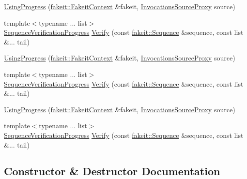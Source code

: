 \begin{DoxyCompactItemize}
\item 
\mbox{\hyperlink{classfakeit_1_1UsingProgress_ac87db7ffa3ed53507cb2c98c2c0b4ee7}{Using\+Progress}} (\mbox{\hyperlink{structfakeit_1_1FakeitContext}{fakeit\+::\+Fakeit\+Context}} \&fakeit, \mbox{\hyperlink{structfakeit_1_1InvocationsSourceProxy}{Invocations\+Source\+Proxy}} source)
\item 
{\footnotesize template$<$typename ... list$>$ }\\\mbox{\hyperlink{classfakeit_1_1SequenceVerificationProgress}{Sequence\+Verification\+Progress}} \mbox{\hyperlink{classfakeit_1_1UsingProgress_a56c5d1ecdf4f405a4a85b348e1fad0f1}{Verify}} (const \mbox{\hyperlink{classfakeit_1_1Sequence}{fakeit\+::\+Sequence}} \&sequence, const list \&... tail)
\item 
\mbox{\hyperlink{classfakeit_1_1UsingProgress_ac87db7ffa3ed53507cb2c98c2c0b4ee7}{Using\+Progress}} (\mbox{\hyperlink{structfakeit_1_1FakeitContext}{fakeit\+::\+Fakeit\+Context}} \&fakeit, \mbox{\hyperlink{structfakeit_1_1InvocationsSourceProxy}{Invocations\+Source\+Proxy}} source)
\item 
{\footnotesize template$<$typename ... list$>$ }\\\mbox{\hyperlink{classfakeit_1_1SequenceVerificationProgress}{Sequence\+Verification\+Progress}} \mbox{\hyperlink{classfakeit_1_1UsingProgress_a56c5d1ecdf4f405a4a85b348e1fad0f1}{Verify}} (const \mbox{\hyperlink{classfakeit_1_1Sequence}{fakeit\+::\+Sequence}} \&sequence, const list \&... tail)
\item 
\mbox{\hyperlink{classfakeit_1_1UsingProgress_ac87db7ffa3ed53507cb2c98c2c0b4ee7}{Using\+Progress}} (\mbox{\hyperlink{structfakeit_1_1FakeitContext}{fakeit\+::\+Fakeit\+Context}} \&fakeit, \mbox{\hyperlink{structfakeit_1_1InvocationsSourceProxy}{Invocations\+Source\+Proxy}} source)
\item 
{\footnotesize template$<$typename ... list$>$ }\\\mbox{\hyperlink{classfakeit_1_1SequenceVerificationProgress}{Sequence\+Verification\+Progress}} \mbox{\hyperlink{classfakeit_1_1UsingProgress_a56c5d1ecdf4f405a4a85b348e1fad0f1}{Verify}} (const \mbox{\hyperlink{classfakeit_1_1Sequence}{fakeit\+::\+Sequence}} \&sequence, const list \&... tail)
\end{DoxyCompactItemize}


\subsection{Constructor \& Destructor Documentation}
\mbox{\label{classfakeit_1_1UsingProgress_ac87db7ffa3ed53507cb2c98c2c0b4ee7}} 

